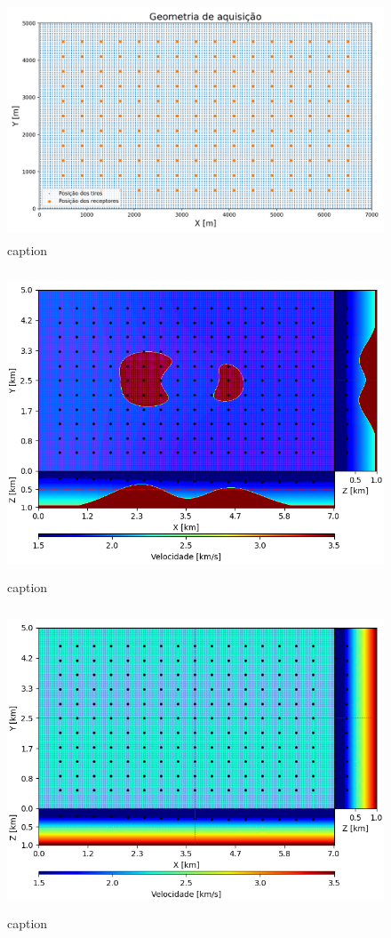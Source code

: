 \begin{figure}[H]
	\centering
	\includegraphics[width=12cm,height=7cm]{Imgs/Metodologia/complete_geometry.png}
	\caption{caption}
	\label{fig:}	
\end{figure}


\begin{figure}[H]
	\centering
	\includegraphics[width=12cm,height=9cm]{Imgs/Metodologia/true_model_geometry.png}
	\caption{caption}
	\label{fig:}	
\end{figure}


\begin{figure}[H]
	\centering
	\includegraphics[width=12cm,height=9cm]{Imgs/Metodologia/init_model_geometry.png}
	\caption{caption}
	\label{fig:}	
\end{figure}




